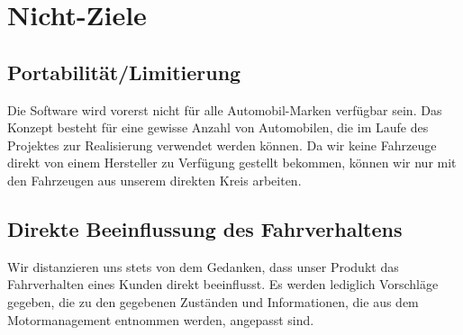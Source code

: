 \section{Nicht-Ziele}

\subsection{Portabilität/Limitierung}
Die Software wird vorerst nicht für alle Automobil-Marken verfügbar sein. Das Konzept besteht für eine gewisse Anzahl von Automobilen, die im Laufe des Projektes zur Realisierung verwendet werden können. Da wir keine Fahrzeuge direkt von einem Hersteller zu Verfügung gestellt bekommen, können wir nur mit den Fahrzeugen aus unserem direkten Kreis arbeiten. 


\subsection{Direkte Beeinflussung des Fahrverhaltens}
Wir distanzieren uns stets von dem Gedanken, dass unser Produkt das Fahrverhalten eines Kunden direkt beeinflusst.
Es werden lediglich Vorschläge gegeben, die zu den gegebenen Zuständen und Informationen,
die aus dem Motormanagement entnommen werden, angepasst sind.



